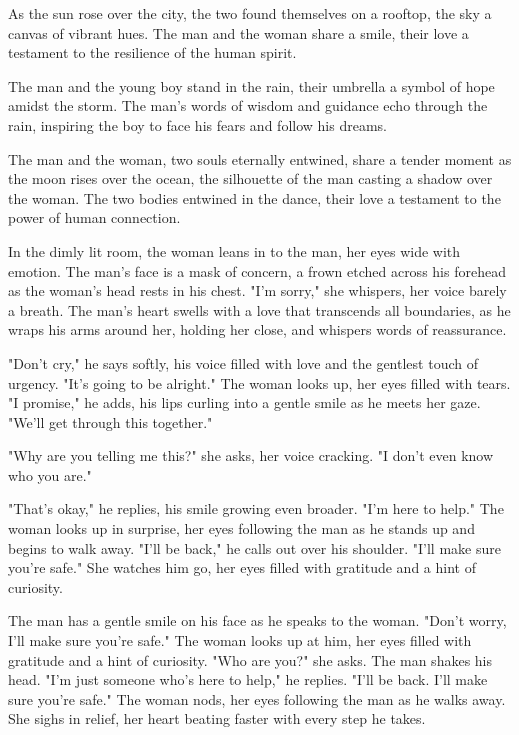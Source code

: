 \documentclass[smalldemyvopaper,11pt,twoside,onecolumn,openright,extrafontsizes]{memoir}
\begin{document}
As the sun rose over the city, the two found themselves on a rooftop, the sky a canvas of vibrant hues. The man and the woman share a smile, their love a testament to the resilience of the human spirit.\par
The man and the young boy stand in the rain, their umbrella a symbol of hope amidst the storm. The man's words of wisdom and guidance echo through the rain, inspiring the boy to face his fears and follow his dreams.\par
The man and the woman, two souls eternally entwined, share a tender moment as the moon rises over the ocean, the silhouette of the man casting a shadow over the woman. The two bodies entwined in the dance, their love a testament to the power of human connection.\par
In the dimly lit room, the woman leans in to the man, her eyes wide with emotion. The man's face is a mask of concern, a frown etched across his forehead as the woman's head rests in his chest. "I'm sorry," she whispers, her voice barely a breath. The man's heart swells with a love that transcends all boundaries, as he wraps his arms around her, holding her close, and whispers words of reassurance.\par
"Don't cry," he says softly, his voice filled with love and the gentlest touch of urgency. "It's going to be alright." The woman looks up, her eyes filled with tears. "I promise," he adds, his lips curling into a gentle smile as he meets her gaze. "We'll get through this together."\par
"Why are you telling me this?" she asks, her voice cracking. "I don't even know who you are."\par
"That's okay," he replies, his smile growing even broader. "I'm here to help." The woman looks up in surprise, her eyes following the man as he stands up and begins to walk away. "I'll be back," he calls out over his shoulder. "I'll make sure you're safe." She watches him go, her eyes filled with gratitude and a hint of curiosity.\par
The man has a gentle smile on his face as he speaks to the woman. "Don't worry, I'll make sure you're safe." The woman looks up at him, her eyes filled with gratitude and a hint of curiosity. "Who are you?" she asks. The man shakes his head. "I'm just someone who's here to help," he replies. "I'll be back. I'll make sure you're safe." The woman nods, her eyes following the man as he walks away. She sighs in relief, her heart beating faster with every step he takes.\par
\end{document}
